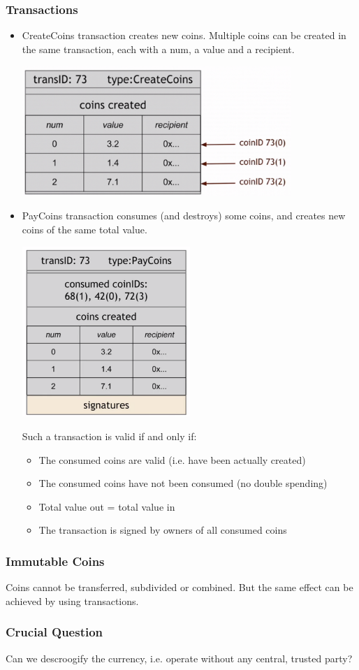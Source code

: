 \subsubsection{Transactions}
\begin{itemize}
  \item CreateCoins transaction creates new coins. Multiple coins can be created in the same transaction, each with a num, a value and a recipient.
  \begin{center}
    \includegraphics[width=0.8\textwidth]{scrooge_create.png}
  \end{center}
  \item PayCoins transaction consumes (and destroys) some coins, and creates new coins of the same total value.
  \begin{center}
    \includegraphics[width=0.5\textwidth]{scrooge_pay.png}
  \end{center}
  Such a transaction is valid if and only if:
  \begin{itemize}
    \item The consumed coins are valid (i.e. have been actually created)
    \item The consumed coins have not been consumed (no double spending)
    \item Total value out = total value in
    \item The transaction is signed by owners of all consumed coins
  \end{itemize}
\end{itemize}
\subsubsection{Immutable Coins}
Coins cannot be transferred, subdivided or combined. But the same effect can be achieved by using transactions.
\subsubsection{Crucial Question}
Can we descroogify the currency, i.e. operate without any central, trusted party?
\ifx\PREAMBLE\undefined

\fi
